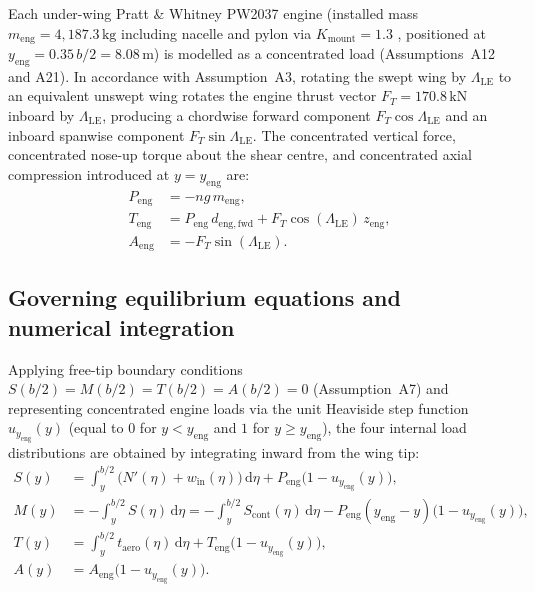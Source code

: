 Each under-wing Pratt \& Whitney PW2037 engine (installed mass $m_{\mathrm{eng}} = 4{,}187.3\,\text{kg}$ including nacelle and pylon via $K_{\mathrm{mount}} = 1.3$ \cite{wp3}, positioned at $y_{\mathrm{eng}} = 0.35\,b/2 = 8.08\,\text{m}$) is modelled as a concentrated load (Assumptions~A12 and A21). In accordance with Assumption~A3, rotating the swept wing by $\Lambda_{\mathrm{LE}}$ to an equivalent unswept wing rotates the engine thrust vector $F_T = 170.8\,\text{kN}$ inboard by $\Lambda_{\mathrm{LE}}$, producing a chordwise forward component $F_T\cos\Lambda_{\mathrm{LE}}$ and an inboard spanwise component $F_T\sin\Lambda_{\mathrm{LE}}$. The concentrated vertical force, concentrated nose-up torque about the shear centre, and concentrated axial compression introduced at $y = y_{\mathrm{eng}}$ are:
\begin{align}
    P_{\mathrm{eng}} &= -n g\,m_{\mathrm{eng}}, \label{eq:P_eng} \\
    T_{\mathrm{eng}} &= P_{\mathrm{eng}}\,d_{\mathrm{eng,fwd}} + F_T\cos(\Lambda_{\mathrm{LE}})\,z_{\mathrm{eng}}, \label{eq:T_eng} \\
    A_{\mathrm{eng}} &= -F_T\sin(\Lambda_{\mathrm{LE}}). \label{eq:A_eng}
\end{align}

\subsection{Governing equilibrium equations and numerical integration}
\label{subsec:integration_and_verification}

Applying free-tip boundary conditions $S(b/2) = M(b/2) = T(b/2) = A(b/2) = 0$ (Assumption~A7) and representing concentrated engine loads via the unit Heaviside step function $u_{y_{\mathrm{eng}}}(y)$ (equal to $0$ for $y < y_{\mathrm{eng}}$ and $1$ for $y \ge y_{\mathrm{eng}}$), the four internal load distributions are obtained by integrating inward from the wing tip:
\begin{align}
    S(y) &= \int_y^{b/2} \bigl(N'(\eta) + w_{\mathrm{in}}(\eta)\bigr)\,\mathrm{d}\eta + P_{\mathrm{eng}}\bigl(1 - u_{y_{\mathrm{eng}}}(y)\bigr), \label{eq:S_int} \\
    M(y) &= -\int_y^{b/2} S(\eta)\,\mathrm{d}\eta = -\int_y^{b/2} S_{\mathrm{cont}}(\eta)\,\mathrm{d}\eta - P_{\mathrm{eng}}(y_{\mathrm{eng}} - y)\bigl(1 - u_{y_{\mathrm{eng}}}(y)\bigr), \label{eq:M_int} \\
    T(y) &= \int_y^{b/2} t_{\mathrm{aero}}(\eta)\,\mathrm{d}\eta + T_{\mathrm{eng}}\bigl(1 - u_{y_{\mathrm{eng}}}(y)\bigr), \label{eq:T_int} \\
    A(y) &= A_{\mathrm{eng}}\bigl(1 - u_{y_{\mathrm{eng}}}(y)\bigr). \label{eq:A_int}
\end{align}

